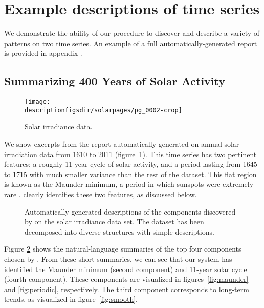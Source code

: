 \section{Example descriptions of time series}
\label{sec:examples}
We demonstrate the ability of our procedure to discover and describe a variety of patterns on two time series.
An example of a full automatically-generated report is provided in appendix .

\subsection{Summarizing 400 Years of Solar Activity}
\label{sec:solar}

\begin{figure}[h]
\centering
\texttt{[image: \\descriptionfigsdir/solarpages/pg\_0002-crop]}
\caption{
Solar irradiance data.}
\label{fig:solar}
\end{figure}

We show excerpts from the report automatically generated on annual solar irradiation data from 1610 to 2011 (figure~\ref{fig:solar}).
This time series has two pertinent features: a roughly 11-year cycle of solar activity, and a period lasting from 1645 to 1715 with much smaller variance than the rest of the dataset.
This flat region is known as the Maunder minimum, a period in which sunspots were extremely rare \citep{Lean1995-vp}.
\procedurename{} clearly identifies these two features, as discussed below.

\begin{figure}[h]
\centering
{}
\caption{
Automatically generated descriptions of the components discovered by \procedurename{} on the solar irradiance data set.
The dataset has been decomposed into diverse structures with simple descriptions.}
\label{fig:exec}
\end{figure}
Figure \ref{fig:exec} shows the natural-language summaries of the top four components chosen by \procedurename{}.
From these short summaries, we can see that our system has identified the Maunder minimum (second component) and 11-year solar cycle (fourth component).
These components are visualized in figures~\ref{fig:maunder} and \ref{fig:periodic}, respectively. 
The third component corresponds to long-term trends, as visualized in figure~\ref{fig:smooth}.

